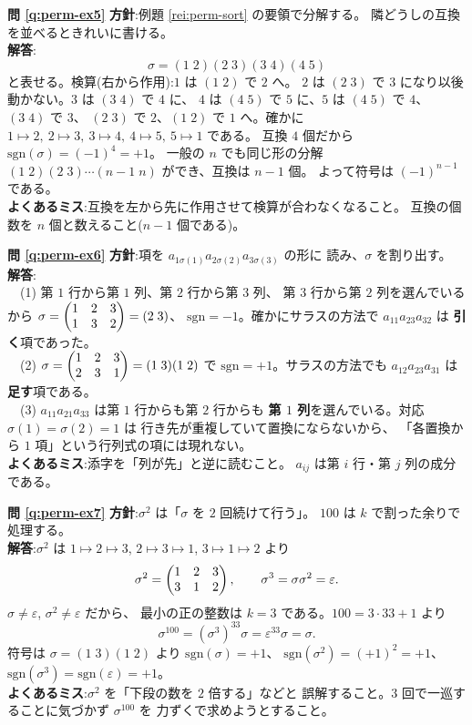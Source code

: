 \bigskip
\noindent\textbf{問 \ref{q:perm-ex5}}\quad
\textbf{方針}:例題 \ref{rei:perm-sort} の要領で分解する。
隣どうしの互換を並べるときれいに書ける。\\
\textbf{解答}:
\[
\sigma = (1\;2)(2\;3)(3\;4)(4\;5)
\]
と表せる。検算(右から作用):$1$ は $(1\;2)$ で $2$ へ。
$2$ は $(2\;3)$ で $3$ になり以後動かない。$3$ は $(3\;4)$ で $4$ に、
$4$ は $(4\;5)$ で $5$ に、$5$ は $(4\;5)$ で $4$、$(3\;4)$ で $3$、
$(2\;3)$ で $2$、$(1\;2)$ で $1$ へ。確かに
$1 \mapsto 2,\ 2 \mapsto 3,\ 3 \mapsto 4,\ 4 \mapsto 5,\ 5 \mapsto 1$ である。
互換 $4$ 個だから $\mathrm{sgn}(\sigma) = (-1)^4 = +1$。
一般の $n$ でも同じ形の分解
$(1\;2)(2\;3)\cdots(n{-}1\;n)$ ができ、互換は $n - 1$ 個。
よって符号は $(-1)^{n-1}$ である。\\
\textbf{よくあるミス}:互換を左から先に作用させて検算が合わなくなること。
互換の個数を $n$ 個と数えること($n - 1$ 個である)。

\bigskip
\noindent\textbf{問 \ref{q:perm-ex6}}\quad
\textbf{方針}:項を $a_{1\sigma(1)} a_{2\sigma(2)} a_{3\sigma(3)}$ の形に
読み、$\sigma$ を割り出す。\\
\textbf{解答}:\\
　(1) 第 $1$ 行から第 $1$ 列、第 $2$ 行から第 $3$ 列、
第 $3$ 行から第 $2$ 列を選んでいるから
$\sigma = \begin{pmatrix}1 & 2 & 3 \\ 1 & 3 & 2\end{pmatrix} = (2\;3)$、
$\mathrm{sgn} = -1$。確かにサラスの方法で $a_{11}a_{23}a_{32}$ は
\textbf{引く}項であった。\\
　(2) $\sigma = \begin{pmatrix}1 & 2 & 3 \\ 2 & 3 & 1\end{pmatrix} = (1\;3)(1\;2)$ で
$\mathrm{sgn} = +1$。サラスの方法でも $a_{12}a_{23}a_{31}$ は
\textbf{足す}項である。\\
　(3) $a_{11}a_{21}a_{33}$ は第 $1$ 行からも第 $2$ 行からも
\textbf{第 $1$ 列}を選んでいる。対応 $\sigma(1) = \sigma(2) = 1$ は
行き先が重複していて置換にならないから、
「各置換から $1$ 項」という行列式の項には現れない。\\
\textbf{よくあるミス}:添字を「列が先」と逆に読むこと。
$a_{ij}$ は第 $i$ 行・第 $j$ 列の成分である。

\bigskip
\noindent\textbf{問 \ref{q:perm-ex7}}\quad
\textbf{方針}:$\sigma^2$ は「$\sigma$ を $2$ 回続けて行う」。
$100$ は $k$ で割った余りで処理する。\\
\textbf{解答}:$\sigma^2$ は
$1 \mapsto 2 \mapsto 3$, $2 \mapsto 3 \mapsto 1$, $3 \mapsto 1 \mapsto 2$ より
\[
\sigma^2 = \begin{pmatrix}1 & 2 & 3 \\ 3 & 1 & 2\end{pmatrix}, \qquad
\sigma^3 = \sigma\sigma^2 = \varepsilon.
\]
$\sigma \neq \varepsilon$, $\sigma^2 \neq \varepsilon$ だから、
最小の正の整数は $k = 3$ である。$100 = 3 \cdot 33 + 1$ より
\[
\sigma^{100} = (\sigma^3)^{33}\sigma = \varepsilon^{33}\sigma = \sigma.
\]
符号は $\sigma = (1\;3)(1\;2)$ より $\mathrm{sgn}(\sigma) = +1$、
$\mathrm{sgn}(\sigma^2) = (+1)^2 = +1$、
$\mathrm{sgn}(\sigma^3) = \mathrm{sgn}(\varepsilon) = +1$。\\
\textbf{よくあるミス}:$\sigma^2$ を「下段の数を $2$ 倍する」などと
誤解すること。$3$ 回で一巡することに気づかず $\sigma^{100}$ を
力ずくで求めようとすること。

